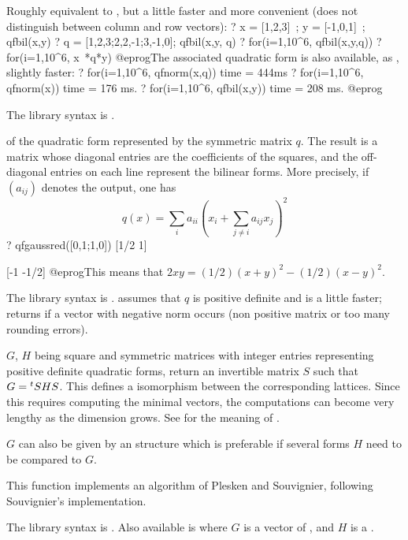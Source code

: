 Roughly equivalent to , but a little faster and
more convenient (does not distinguish between column and row vectors):
\bprog
? x = [1,2,3]~; y = [-1,0,1]~; qfbil(x,y)
? q = [1,2,3;2,2,-1;3,-1,0]; qfbil(x,y, q)
? for(i=1,10^6, qfbil(x,y,q))
? for(i=1,10^6, x~*q*y)
@eprog\noindent The associated quadratic form is also available, as
, slightly faster:
\bprog
? for(i=1,10^6, qfnorm(x,q))
time = 444ms
? for(i=1,10^6, qfnorm(x))
time = 176 ms.
? for(i=1,10^6, qfbil(x,y))
time = 208 ms.
@eprog

The library syntax is .

\label{se:qfgaussred}
 of the
quadratic form represented by the symmetric matrix $q$. The result is a
matrix whose diagonal entries are the coefficients of the squares, and the
off-diagonal entries on each line represent the bilinear forms. More
precisely, if $(a_{ij})$ denotes the output, one has
$$ q(x) = \sum_i a_{ii} (x_i + \sum_{j \neq i} a_{ij} x_j)^2 $$
\bprog
? qfgaussred([0,1;1,0])
[1/2 1]

[-1 -1/2]
@eprog\noindent This means that $2xy = (1/2)(x+y)^2 - (1/2)(x-y)^2$.

The library syntax is .
 assumes that $q$ is
 positive definite and is a little faster; returns  if a vector
 with negative norm occurs (non positive matrix or too many rounding errors).

\label{se:qfisom}
$G$, $H$ being square and symmetric matrices with integer entries representing
positive definite quadratic forms, return an invertible matrix $S$ such that
$G={^t}S\*H\*S$. This defines a isomorphism between the corresponding lattices.
Since this requires computing the minimal vectors, the computations can
become very lengthy as the dimension grows.
See  for the meaning of .

$G$ can also be given by an  structure which is preferable if
several forms $H$ need to be compared to $G$.

This function implements an algorithm of Plesken and Souvignier, following
Souvignier's implementation.

The library syntax is .
Also available is 
where $G$ is a vector of , and $H$ is a .


